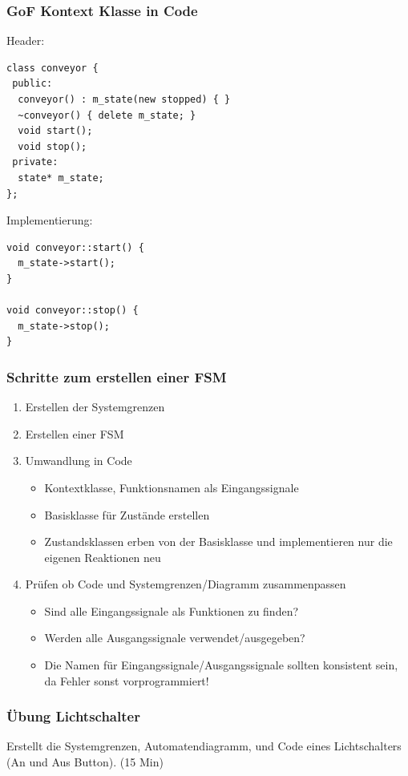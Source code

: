 \documentclass{beamer}
\begin{document}
\begin{frame}[fragile]
 \frametitle{GoF Kontext Klasse in Code}
 Header:
 \begin{lstlisting}
class conveyor {
 public:
  conveyor() : m_state(new stopped) { }
  ~conveyor() { delete m_state; }
  void start();
  void stop();
 private:
  state* m_state;
};
 \end{lstlisting}
 Implementierung:
 \begin{lstlisting}
void conveyor::start() {
  m_state->start();
}

void conveyor::stop() {
  m_state->stop();
}
 \end{lstlisting}
\end{frame}

\begin{frame}
 \frametitle{Schritte zum erstellen einer FSM}
 \begin{enumerate}
  \item Erstellen der Systemgrenzen
  \item Erstellen einer FSM
  \item Umwandlung in Code
  \begin{itemize}
   \item Kontextklasse, Funktionsnamen als Eingangssignale
   \item Basisklasse f\"ur Zust\"ande erstellen
   \item Zustandsklassen erben von der Basisklasse und implementieren nur die eigenen Reaktionen neu
  \end{itemize}
  \item Pr\"ufen ob Code und Systemgrenzen/Diagramm zusammenpassen
  \begin{itemize}
   \item Sind alle Eingangssignale als Funktionen zu finden?
   \item Werden alle Ausgangssignale verwendet/ausgegeben?
   \item Die Namen f\"ur Eingangssignale/Ausgangssignale sollten konsistent sein, da Fehler sonst vorprogrammiert!
  \end{itemize}
 \end{enumerate}
\end{frame}

\begin{frame}
 \frametitle{\"Ubung Lichtschalter}
 Erstellt die Systemgrenzen, Automatendiagramm, und Code eines Lichtschalters (An und Aus Button). (15 Min)
\end{frame}
\end{document}
